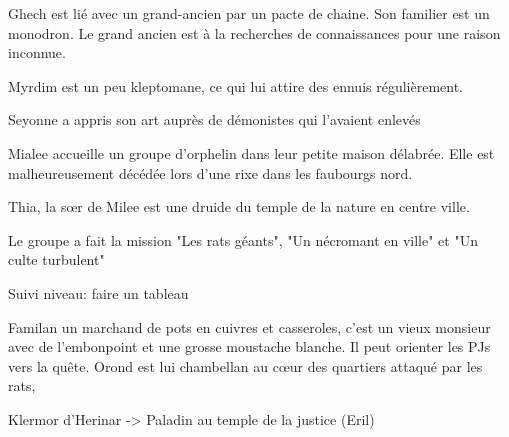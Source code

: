 Ghech est lié avec un grand-ancien par un pacte de chaine. Son familier est un 
monodron. Le grand ancien est à la recherches de connaissances pour une raison
inconnue.

Myrdim est un peu kleptomane, ce qui lui attire des ennuis régulièrement.

Seyonne a appris son art auprès de démonistes qui l'avaient enlevés

Mialee accueille un groupe d'orphelin dans leur petite maison délabrée. Elle
est malheureusement décédée lors d'une rixe dans les faubourgs nord.

Thia, la s\oe{}r de Milee est une druide du temple de la nature en centre ville.

Le groupe a fait la mission "Les rats géants", "Un nécromant en ville" et "Un culte turbulent"

Suivi niveau: faire un tableau

Familan un marchand de pots en cuivres et 
casseroles, c'est un vieux monsieur avec de l'embonpoint et une grosse 
moustache blanche. Il peut orienter les PJs vers la quête.
Orond est lui chambellan au c\oe{}ur des quartiers attaqué par les rats,

Klermor d'Herinar -> Paladin au temple de la justice (Eril)


